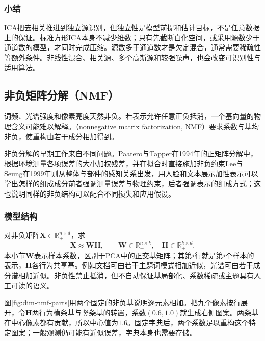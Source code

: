 \subsubsection{小结}
\label{sec:dim-ica-summary}

ICA把去相关推进到独立源识别，但独立性是模型前提和估计目标，不是任意数据上的保证。标准方形ICA本身不减少维数；只有先截断白化空间，或采用源数少于通道数的模型，才同时完成压缩。源数多于通道数才是欠定混合，通常需要稀疏性等额外条件。非线性混合、相关源、多个高斯源和较强噪声，也会改变可识别性与适用算法。

\subsection{非负矩阵分解（NMF）}
\label{sec:dim-nmf}

词频、光谱强度和像素亮度天然非负。若表示允许任意正负抵消，一个基向量的物理含义可能难以解释。（nonnegative matrix factorization, NMF）要求系数与基均非负，使重构由若干成分相加得到。

非负分解的早期工作来自不同问题。Paatero与Tapper在1994年的正矩阵分解中，根据环境测量各项误差的大小加权残差，并在拟合时直接施加非负约束Lee与Seung在1999年则从整体与部件的感知关系出发，用人脸和文本展示加性表示可以学出怎样的组成成分前者强调测量误差与物理约束，后者强调表示的组成方式；这也说明同样的非负结构可以配合不同损失和应用假设。

\subsubsection{模型结构}
\label{sec:dim-nmf-structure}

对非负矩阵$\bm{X}\in\mathbb{R}_{+}^{n\times d}$，求
\begin{equation}
  \bm{X}\approx\bm{W}\bm{H},\qquad
  \bm{W}\in\mathbb{R}_{+}^{n\times k},\quad
  \bm{H}\in\mathbb{R}_{+}^{k\times d}.
  \label{eq:dim-nmf-factorization}
\end{equation}
本小节$\bm{W}$表示样本系数，区别于PCA中的正交基矩阵；其第$i$行就是第$i$个样本的表示，$\bm{H}$各行为共享基。例如文档可由若干主题词模式相加近似，光谱可由若干成分谱相加近似。非负性禁止抵消，但不自动保证基局部化、系数稀疏或主题具有人工可读的语义。

图\ref{fig:dim-nmf-parts}用两个固定的非负基说明逐元素相加。把九个像素按行展开，令$\bm{H}$两行为横条基与竖条基的转置，系数$(0.6,1.0)$就生成右侧图案。两条基在中心像素都有贡献，所以中心值为$1.6$。固定字典后，两个系数足以重构这个特定图案；一般观测仍可能有近似误差，字典本身也需要存储。

